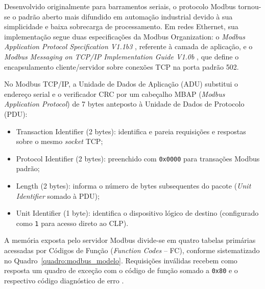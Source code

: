 Desenvolvido originalmente para barramentos seriais, o protocolo Modbus tornou-se o padrão aberto mais difundido em automação industrial devido à sua simplicidade e baixa sobrecarga de processamento. Em redes Ethernet, sua implementação segue duas especificações da Modbus Organization: o \textit{Modbus Application Protocol Specification V1.1b3} \cite{modbus_app_v11b3}, referente à camada de aplicação, e o \textit{Modbus Messaging on TCP/IP Implementation Guide V1.0b} \cite{modbus_tcp_v10b}, que define o encapsulamento cliente/servidor sobre conexões TCP na porta padrão 502.

No Modbus TCP/IP, a Unidade de Dados de Aplicação (ADU) substitui o endereço serial e o verificador CRC por um cabeçalho MBAP (\textit{Modbus Application Protocol}) de 7 bytes anteposto à Unidade de Dados de Protocolo (PDU):
\begin{itemize}
  \item Transaction Identifier (2 bytes): identifica e pareia requisições e respostas sobre o mesmo \textit{socket} TCP;
  \item Protocol Identifier (2 bytes): preenchido com \texttt{0x0000} para transações Modbus padrão;
  \item Length (2 bytes): informa o número de bytes subsequentes do pacote (\textit{Unit Identifier} somado à PDU);
  \item Unit Identifier (1 byte): identifica o dispositivo lógico de destino (configurado como \texttt{1} para acesso direto ao CLP).
\end{itemize}

A memória exposta pelo servidor Modbus divide-se em quatro tabelas primárias acessadas por Códigos de Função (\textit{Function Codes} -- FC), conforme sistematizado no Quadro~\ref{quadro:modbus_modelo}. Requisições inválidas recebem como resposta um quadro de exceção com o código de função somado a \texttt{0x80} e o respectivo código diagnóstico de erro \cite{modbus_app_v11b3}.

